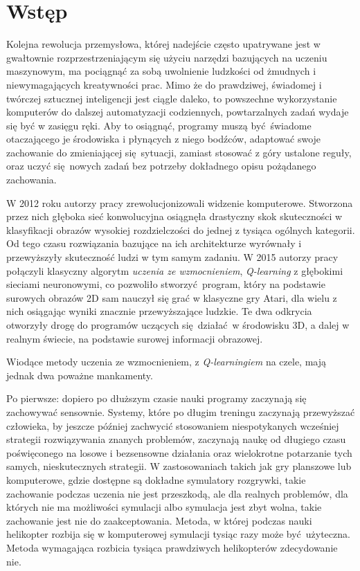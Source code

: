 \chapter{Wstęp}

Kolejna rewolucja przemysłowa, której nadejście często upatrywane jest w gwałtownie rozprzestrzeniającym się użyciu narzędzi bazujących na uczeniu maszynowym, ma pociągnąć za sobą uwolnienie ludzkości od żmudnych i niewymagających kreatywności prac. Mimo że do prawdziwej, świadomej i twórczej sztucznej inteligencji jest ciągle daleko, to powszechne wykorzystanie komputerów do dalszej automatyzacji codziennych, powtarzalnych zadań wydaje się być w zasięgu ręki. Aby to osiągnąć, programy muszą być świadome otaczającego je środowiska i płynących z niego bodźców, adaptować swoje zachowanie do zmieniającej się sytuacji, zamiast stosować z góry ustalone reguły, oraz uczyć się nowych zadań bez potrzeby dokładnego opisu pożądanego zachowania. 

W 2012 roku autorzy pracy \cite{NIPS2012_4824} zrewolucjonizowali widzenie komputerowe. Stworzona przez nich głęboka sieć konwolucyjna osiągnęła drastyczny skok skuteczności w klasyfikacji obrazów wysokiej rozdzielczości do jednej z tysiąca ogólnych kategorii. Od tego czasu rozwiązania bazujące na ich architekturze wyrównały i przewyższyły skuteczność ludzi w tym samym zadaniu. W 2015 autorzy pracy \cite{mnih2015human} połączyli klasyczny algorytm \textit{uczenia ze wzmocnieniem}, \textit{Q-learning} z głębokimi sieciami neuronowymi, co pozwoliło stworzyć program, który na podstawie surowych obrazów 2D sam nauczył się grać w klasyczne gry Atari, dla wielu z nich osiągając wyniki znacznie przewyższające ludzkie. Te dwa odkrycia otworzyły drogę do programów uczących się działać w środowisku 3D, a dalej w realnym świecie, na podstawie surowej informacji obrazowej.

Wiodące metody uczenia ze wzmocnieniem, z \textit{Q-learningiem} na czele, mają jednak dwa poważne mankamenty.

Po pierwsze: dopiero po dłuższym czasie nauki programy zaczynają się zachowywać sensownie. Systemy, które po długim treningu zaczynają przewyższać człowieka, by jeszcze później zachwycić stosowaniem niespotykanych wcześniej strategii rozwiązywania znanych problemów, zaczynają naukę od długiego czasu poświęconego na losowe i bezsensowne działania oraz wielokrotne potarzanie tych samych, nieskutecznych strategii. W zastosowaniach takich jak gry planszowe lub komputerowe, gdzie dostępne są dokładne symulatory rozgrywki, takie zachowanie podczas uczenia nie jest przeszkodą, ale dla realnych problemów, dla których nie ma możliwości symulacji albo symulacja jest zbyt wolna, takie zachowanie jest nie do zaakceptowania. Metoda, w której podczas nauki helikopter rozbija się w komputerowej symulacji tysiąc razy może być użyteczna. Metoda wymagająca rozbicia tysiąca prawdziwych helikopterów zdecydowanie nie.

